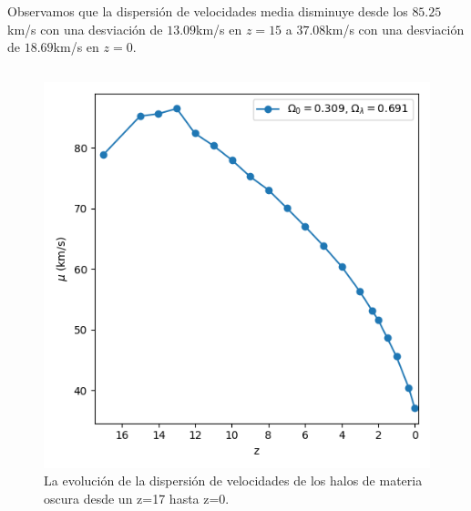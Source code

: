 \documentclass{beamer}
\begin{document}
	\begin{frame}
		\small Observamos que la dispersión de velocidades media disminuye desde los $85.25$km/s con una desviación de $13.09$km/s en $z=15$ a $37.08$km/s con una desviación de $18.69$km/s en $z=0$.
		
		\begin{columns}[t]
			\begin{column}{.5\textwidth}
				\begin{figure}
					\centering
					\includegraphics[scale=0.3]{RunCanonica/VelDisp_Mean_RunCanonica.png}
					\caption{\footnotesize La evolución de la dispersión de velocidades de los halos de materia oscura desde un z=17 hasta z=0.}
					\label{fig:Canon-VelDispMean}
				\end{figure}
			\end{column}


\end{columns}
\end{frame}
\end{document}
